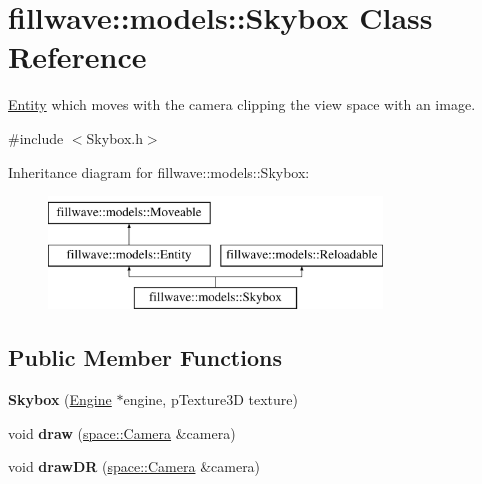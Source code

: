 \hypertarget{classfillwave_1_1models_1_1Skybox}{}\section{fillwave\+:\+:models\+:\+:Skybox Class Reference}
\label{classfillwave_1_1models_1_1Skybox}


\hyperlink{classfillwave_1_1models_1_1Entity}{Entity} which moves with the camera clipping the view space with an image.  




{\ttfamily \#include $<$Skybox.\+h$>$}

Inheritance diagram for fillwave\+:\+:models\+:\+:Skybox\+:\begin{figure}[H]
\begin{center}
\leavevmode
\includegraphics[height=3.000000cm]{classfillwave_1_1models_1_1Skybox}
\end{center}
\end{figure}
\subsection*{Public Member Functions}
\begin{DoxyCompactItemize}
\item 
\hypertarget{classfillwave_1_1models_1_1Skybox_a94862280481ceeb55988f58ad358bbec}{}{\bfseries Skybox} (\hyperlink{classfillwave_1_1Engine}{Engine} $\ast$engine, p\+Texture3\+D texture)\label{classfillwave_1_1models_1_1Skybox_a94862280481ceeb55988f58ad358bbec}

\item 
\hypertarget{classfillwave_1_1models_1_1Skybox_a358662b08f794e7eefff0da0398d9153}{}void {\bfseries draw} (\hyperlink{classfillwave_1_1space_1_1Camera}{space\+::\+Camera} \&camera)\label{classfillwave_1_1models_1_1Skybox_a358662b08f794e7eefff0da0398d9153}

\item 
\hypertarget{classfillwave_1_1models_1_1Skybox_ab0d5fc66129d44680072c22f95f526cb}{}void {\bfseries draw\+D\+R} (\hyperlink{classfillwave_1_1space_1_1Camera}{space\+::\+Camera} \&camera)\label{classfillwave_1_1models_1_1Skybox_ab0d5fc66129d44680072c22f95f526cb}

\end{DoxyCompactItemize}
